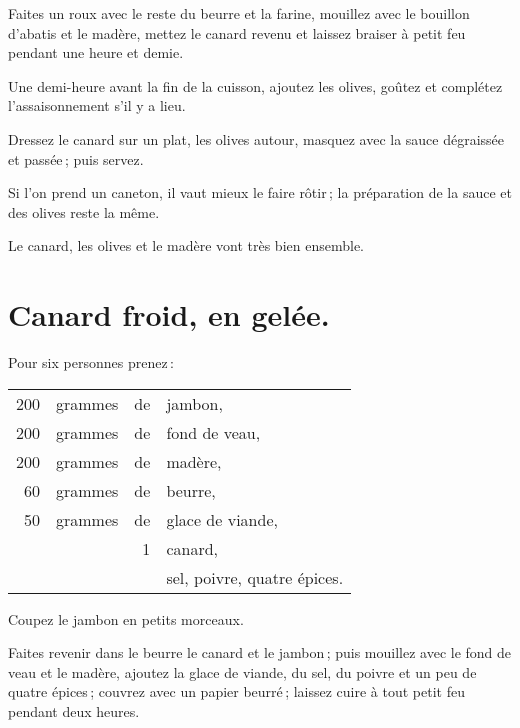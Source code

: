 Faites un roux avec le reste du beurre et la farine, mouillez avec le bouillon
d'abatis et le madère, mettez le canard revenu et laissez braiser à petit feu
pendant une heure et demie.

Une demi-heure avant la fin de la cuisson, ajoutez les olives, goûtez et
complétez l'assaisonnement s'il y a lieu.

Dressez le canard sur un plat, les olives autour, masquez avec la sauce
dégraissée et passée ; puis servez.

Si l'on prend un caneton, il vaut mieux le faire rôtir ; la préparation de la
sauce et des olives reste la même.

Le canard, les olives et le madère vont très bien ensemble.

\section*{\centering Canard froid, en gelée.}
{}

Pour six personnes prenez :

\medskip

\footnotesize
\begin{longtable}{rrrp{16em}}
    200 & grammes & de & jambon,                                                                          \\
    200 & grammes & de & fond de veau,                                                                    \\
    200 & grammes & de & madère,                                                                          \\
     60 & grammes & de & beurre,                                                                          \\
     50 & grammes & de & glace de viande,                                                                 \\
        &         &  1 & canard,                                                                          \\
        &         &    & sel, poivre, quatre épices.                                                      \\
\end{longtable}
\normalsize

Coupez le jambon en petits morceaux.

Faites revenir dans le beurre le canard et le jambon ; puis mouillez avec le
fond de veau et le madère, ajoutez la glace de viande, du sel, du poivre et un
peu de quatre épices ; couvrez avec un papier beurré ; laissez cuire à tout
petit feu pendant deux heures.

